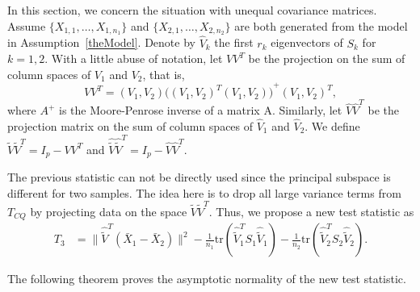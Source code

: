 \documentclass[review]{elsarticle}
\theoremstyle{plain}
\theoremstyle{definition}
\theoremstyle{remark}
\begin{document}
In this section, we concern the situation with unequal covariance matrices.
Assume $\{X_{1,1},\ldots, X_{1,n_1}\}$ and $\{X_{2,1},\ldots, X_{2,n_2}\}$ are both generated from the model in Assumption~\ref{theModel}.
Denote by $\hat{V}_k$ the first $r_k$ eigenvectors of $S_k$ for $k=1,2$.
With a little abuse of notation, let $VV^T$ be the projection on the sum of column spaces of $V_1$ and $V_2$, that is,
\begin{equation*}
    VV^T =(V_1,V_2){\big({(V_1,V_2)}^T (V_1,V_2)\big)}^{+}{(V_1,V_2)}^T,
\end{equation*}
where $A^{+}$ is the Moore-Penrose inverse of a matrix A. Similarly, let $\hat{V}\hat{V}^T$ be the projection matrix on the sum of column spaces of $\hat{V}_1$ and $\hat{V}_2$.
 We define $\tilde{V}\tilde{V}^T=I_{p}-VV^T$ and $\hat{\tilde{V}}\hat{\tilde{V}}^T=I_{p}-\hat{V}\hat{V}^T$. 

The previous statistic can not be directly used since the principal subspace is different for two samples.
The idea here is to drop all large variance terms from $T_{CQ}$ by projecting data on the space $\tilde{V}\tilde{V}^T$. Thus, we propose a new test statistic as
\begin{equation*}
\begin{aligned}
    T_3&=\|\hat{\tilde{V}}^T(\bar{X}_1-\bar{X}_2)\|^2-\frac{1}{n_1}\mathrm{tr}(\hat{\tilde{V}}_1^T S_1\hat{\tilde{V}}_1)-\frac{1}{n_2}\mathrm{tr}(\hat{\tilde{V}}_2^T S_2\hat{\tilde{V}}_2).
\end{aligned}
\end{equation*}


The following theorem proves the asymptotic normality of the new test statistic.

\end{document}
